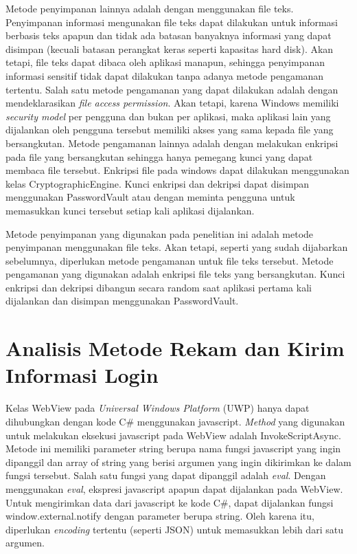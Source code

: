 Metode penyimpanan lainnya adalah dengan menggunakan file teks. Penyimpanan informasi mengunakan file teks dapat dilakukan untuk informasi berbasis teks apapun dan tidak ada batasan banyaknya informasi yang dapat disimpan (kecuali batasan perangkat keras seperti kapasitas hard disk). Akan tetapi, file teks dapat dibaca oleh aplikasi manapun, sehingga penyimpanan informasi sensitif tidak dapat dilakukan tanpa adanya metode pengamanan tertentu. Salah satu metode pengamanan yang dapat dilakukan adalah dengan mendeklarasikan \textit{file access permission}. Akan tetapi, karena Windows memiliki \textit{security model} per pengguna dan bukan per aplikasi, maka aplikasi lain yang dijalankan oleh pengguna tersebut memiliki akses yang sama kepada file yang bersangkutan. Metode pengamanan lainnya adalah dengan melakukan enkripsi pada file yang bersangkutan sehingga hanya pemegang kunci yang dapat membaca file tersebut. Enkripsi file pada windows dapat dilakukan menggunakan kelas CryptographicEngine. Kunci enkripsi dan dekripsi dapat disimpan menggunakan PasswordVault atau dengan meminta pengguna untuk memasukkan kunci tersebut setiap kali aplikasi dijalankan.

Metode penyimpanan yang digunakan pada penelitian ini adalah metode penyimpanan menggunakan file teks. Akan tetapi, seperti yang sudah dijabarkan sebelumnya, diperlukan metode pengamanan untuk file teks tersebut. Metode pengamanan yang digunakan adalah enkripsi file teks yang bersangkutan. Kunci enkripsi dan dekripsi dibangun secara random saat aplikasi pertama kali dijalankan dan disimpan menggunakan PasswordVault.



\section{Analisis Metode Rekam dan Kirim Informasi Login}
\label{sec:metode_rekam}

Kelas WebView pada \textit{Universal Windows Platform} (UWP) hanya dapat dihubungkan dengan kode C\# menggunakan javascript. \textit{Method} yang digunakan untuk melakukan eksekusi javascript pada WebView adalah InvokeScriptAsync. Metode ini memiliki parameter string berupa nama fungsi javascript yang ingin dipanggil dan array of string yang berisi argumen yang ingin dikirimkan ke dalam fungsi tersebut. Salah satu fungsi yang dapat dipanggil adalah \textit{eval}. Dengan menggunakan \textit{eval}, ekspresi javascript apapun dapat dijalankan pada WebView. Untuk mengirimkan data dari javascript ke kode C\#, dapat dijalankan fungsi window.external.notify dengan parameter berupa string. Oleh karena itu, diperlukan \textit{encoding} tertentu (seperti JSON) untuk memasukkan lebih dari satu argumen.

